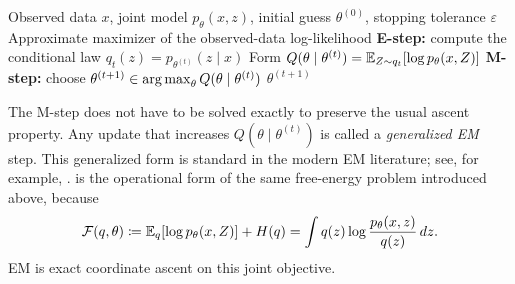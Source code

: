 \begin{algorithm}
  \caption{Expectation--maximization (EM)}
  \label{alg:em}
  \begin{algorithmic}[1]
    \Require Observed data $x$, joint model $p_\theta(x,z)$, initial guess $\theta^{(0)}$, stopping tolerance $\varepsilon$
    \Ensure Approximate maximizer of the observed-data log-likelihood
      \State \textbf{E-step:} compute the conditional law $q_t(z)=p_{\theta^{(t)}}(z\mid x)$
      \State Form $Q(\theta\mid \theta^{(t)}) = \mathbb{E}_{Z\sim q_t}\!\left[\log p_\theta(x,Z)\right]$
      \State \textbf{M-step:} choose $\theta^{(t+1)} \in \operatorname*{arg\,max}_{\theta} Q(\theta\mid \theta^{(t)})$
        \State \Return $\theta^{(t+1)}$
      \EndIf
    \EndFor
  \end{algorithmic}
\end{algorithm}

The M-step does not have to be solved exactly to preserve the usual ascent property.
Any update that increases $Q(\theta\mid \theta^{(t)})$ is called a \emph{generalized EM} step.
This generalized form is standard in the modern EM literature; see, for example, \citet[\S2.1]{balakrishnan_wainwright_yu_2014_em}.
 is the operational form of the same free-energy problem introduced above, because
\begin{equation}
  \mathcal{F}(q,\theta)
  \coloneqq
  \mathbb{E}_q[\log p_\theta(x,Z)] + H(q)
  =
  \int q(z)\log \frac{p_\theta(x,z)}{q(z)}\,dz.
  \label{eq:em-free-energy}
\end{equation}
EM is exact coordinate ascent on this joint objective.

